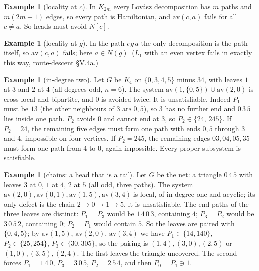 \documentclass[11pt]{amsart}
\theoremstyle{definition}
\newtheorem{example}[theorem]{Example}
\newcommand{\av}{\mathrm{av}}
\begin{document}
\begin{example}[locality at $c$]\label{ex:Kn}
In $K_{2m}$ every Lov\'asz decomposition has $m$ paths and $m(2m-1)$ edges, so every path is
Hamiltonian, and $\av(c,a)$ fails for all $c\ne a$. So heads must avoid $N[c]$.
\end{example}

\begin{example}[locality at $g$]\label{ex:path}
In the path $c\,g\,a$ the only decomposition is the path itself, so $\av(c,a)$ fails; here
$a\in N(g)$. ($L_1$ with an even vertex fails in exactly this way, route-descent \S V.4a.)
\end{example}

\begin{example}[in-degree two]\label{ex:indeg}
Let $G$ be $K_4$ on $\{0,3,4,5\}$ minus $34$, with leaves $1$ at $3$ and $2$ at $4$ (all degrees odd,
$n=6$). The system $\av(1,\{0,5\})\cup\av(2,0)$ is cross-local and bipartite, and $0$ is
avoided twice. It is unsatisfiable. Indeed $P_1$ must be $13$ (the other neighbours of $3$ are
$0,5$), so $3$ has no further end and $0\,3\,5$ lies inside one path. $P_2$ avoids $0$ and cannot
end at $3$, so $P_2\in\{24,\,245\}$. If $P_2=24$, the remaining five edges must form one path
with ends $0,5$ through $3$ and $4$, impossible on four vertices. If $P_2=245$, the remaining
edges $03,04,05,35$ must form one path from $4$ to $0$, again impossible. Every proper subsystem is
satisfiable.
\end{example}

\begin{example}[chains: a head that is a tail]\label{ex:net}
Let $G$ be the net: a triangle $0\,4\,5$ with leaves $3$ at $0$, $1$ at $4$, $2$ at $5$ (all
odd, three paths). The system $\av(2,0),\av(0,1),\av(1,5),\av(3,4)$ is local, of in-degree one and
acyclic; its only defect is the chain $2\to0\to1\to5$. It is unsatisfiable. The end paths of the
three leaves are distinct: $P_1=P_3$ would be $1\,4\,0\,3$, containing $4$; $P_3=P_2$ would be
$3\,0\,5\,2$, containing $0$; $P_2=P_1$ would contain $5$. So the leaves are paired with
$\{0,4,5\}$; by $\av(1,5)$, $\av(2,0)$, $\av(3,4)$ we have $P_1\in\{14,140\}$, $P_2\in\{25,254\}$,
$P_3\in\{30,305\}$, so the pairing is $(1,4),(3,0),(2,5)$ or $(1,0),(3,5),(2,4)$. The first leaves the triangle
uncovered. The second forces $P_1=1\,4\,0$, $P_3=3\,0\,5$, $P_2=2\,5\,4$, and then $P_0=P_1\ni1$.
\end{example}
\end{document}
